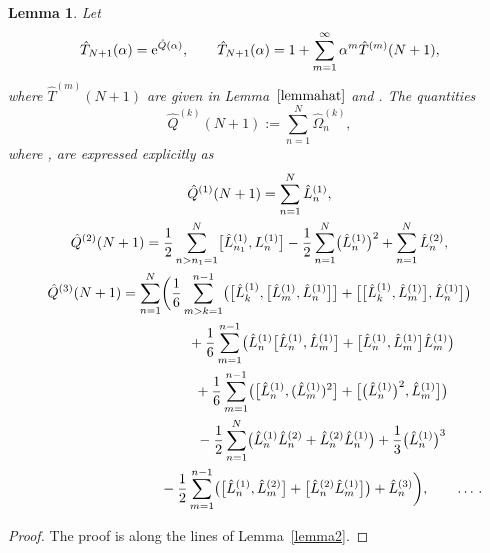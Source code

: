 \documentclass[10pt,a4paper]{amsart}
\numberwithin{equation}{section}
\newtheorem{lem}[thm]{Lemma}
\theoremstyle{definition}
\def\mathcal#1{#1}%
\begin{document}
\begin{lem}%
Let
\[
\hat T_{N+1}(\alpha) = {\rm e}^{\hat {\mathcal Q}(\alpha)}, \qquad \hat T_{N+1}(\alpha)=1+\sum_{m=1}^{\infty}\alpha^m \hat T^{(m)}(N+1),
\]
 where $\hat T^{(m)}(N+1)$ are given in Lemma~$\ref{lemmahat}$ and
\smash{$\hat {\mathcal Q}(\alpha) = \sum_{m=1}^{\infty}\alpha^m \hat {\mathcal Q}^{(m)}$}. The quantities
\[
\hat {\mathcal Q}^{(k)}(N+1):= \sum_{n=1}^N \hat \Omega^{(k)}_n,
\]
where \smash{$\hat \Omega^{(k)}_n = \hat {\mathcal Q}^{(k)}(n+1) - \hat {\mathcal Q}^{(k)}(n)$},
are expressed explicitly as
\begin{gather}
\hat {\mathcal Q}^{(1)}(N+1) = \sum_{n=1}^{N} \hat L^{(1)}_{n},\cr
\hat {\mathcal Q}^{(2)}(N+1) = \frac{1}{2}\sum_{n>n_1=1}^{N} \bigl[ \hat L^{(1)}_{n_1}, L^{(1)}_{n} \bigr] -
\frac{1}{2}\sum_{n=1}^{N} \bigl(\hat L^{(1)}_{n}\bigr)^2+\sum_{n=1}^N \hat L_n^{(2)}, \cr
\hat {\mathcal Q}^{(3)}(N+1) = \sum_{n=1}^N \biggl(\frac{1}{6} \sum_{m>k=1}^{n-1}
\bigl(\bigl[\hat L^{(1)}_{k}, \bigl[\hat L^{(1)}_{m}, \hat L^{(1)}_{n} \bigr] \bigr] +
\bigl[\bigl[\hat L^{(1)}_{k}, \hat L^{(1)}_{m} \bigr], \hat L^{(1)}_{n} \bigr]\bigr) \cr
\hphantom{\hat {\mathcal Q}^{(3)}(N+1) =\sum_{n=1}^N \biggl(}{}
+ \frac{1}{6} \sum_{m=1}^{n-1} \bigl(\hat L^{(1)}_{n}\bigl[\hat L^{(1)}_{n},
\hat L^{(1)}_{m}\bigr] + \bigl[\hat L^{(1)}_{n}, \hat L^{(1)}_{m}\bigr] \hat L^{(1)}_{m}\bigr) \cr
\hphantom{\hat {\mathcal Q}^{(3)}(N+1) =\sum_{n=1}^N \biggl(}{}
+\frac{1}{6} \sum_{m=1}^{n-1} \bigl(\bigl[\hat L^{(1)}_{n}, (\hat L^{(1)}_{m})^2\bigr] +
\bigl[\bigl(\hat L^{(1)}_{n}\bigr)^2, \hat L^{(1)}_{m}\bigr] \bigr)\nonumber\\
\hphantom{\hat {\mathcal Q}^{(3)}(N+1) =\sum_{n=1}^N \biggl(}{}
-\frac{1}{2} \sum_{n=1}^{N} \bigl(\hat L_n^{(1)} \hat L_n^{(2)} +\hat L_n^{(2)}\hat L_n^{(1)} \bigr)+\frac{1}{3} \bigl(\hat L^{(1)}_{n}\bigr)^3 \nonumber\\
\hphantom{\hat {\mathcal Q}^{(3)}(N+1) =\sum_{n=1}^N \biggl(}{}
-\frac{1}{2} \sum_{m=1}^{n-1}\bigl( \bigl[\hat L^{(1)}_n, \hat L_m^{(2)} \bigr] +\bigl[\hat L^{(2)}_n \hat L^{(1)}_m \bigr] \bigr) + \hat L_n^{(3)} \biggr), \qquad \dots\,. \label{QQb}
\end{gather}
\end{lem}
\begin{proof}
The proof is along the lines of Lemma~\ref{lemma2}.
\end{proof}
\end{document}
